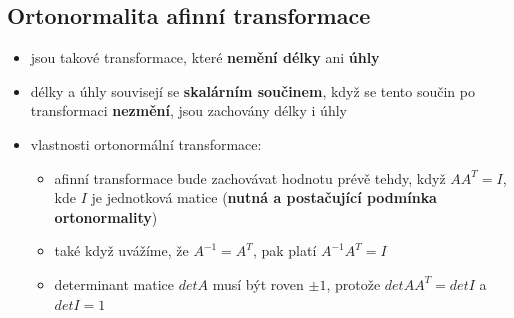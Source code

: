 \subsection{Ortonormalita afinní transformace}
\begin{itemize}
	\item jsou takové transformace, které \textbf{nemění délky} ani \textbf{úhly}
	\item délky a úhly souvisejí se \textbf{skalárním součinem}, když se tento součin po transformaci \textbf{nezmění}, jsou zachovány délky i úhly
	\item vlastnosti ortonormální transformace:
		\begin{itemize}
			\item afinní transformace bude zachovávat hodnotu prévě tehdy, když $AA^T=I$, kde $I$ je jednotková matice (\textbf{nutná a postačující podmínka ortonormality})
			\item také když uvážíme, že $A^{-1} = A^T$, pak platí $A^{-1} A^T = I$
			\item determinant matice $det A$ musí být roven $\pm 1$, protože $det AA^T = det I$ a $det I = 1$
		\end{itemize}
\end{itemize}


